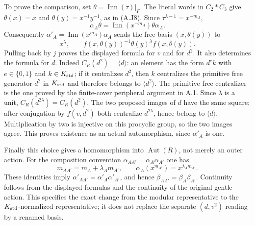 To prove the comparison, set
$\theta=\operatorname{Inn}(\tau)|_F$.
The literal words in $C_2*C_3$ give
$\theta(x)=x$ and $\theta(y)=x^{-1}y^{-1}$, as in
(A.J8).  Since $\tau^{\lambda-1}=x^{-m_A}$,
\[
 \alpha_A\theta
       =\operatorname{Inn}(x^{-m_A})\theta\alpha_A.
\]
Consequently $\alpha'_A=\operatorname{Inn}(x^{m_A})
\alpha_A$ sends the free basis $(x,\theta(y))$ to
\[
 x^\lambda,\qquad
 f(x,\theta(y))^{-1}\theta(y)^\lambda f(x,\theta(y)).
\]
Pulling back by $j$ proves the displayed formula for $v$
and for $d^2$.  It also determines the formula for $d$.
Indeed $C_R(d^2)=\langle d\rangle$: an element has the
form $d^e k$ with $e\in\{0,1\}$ and $k\in K_{\rm std}$;
if it centralizes $d^2$, then $k$ centralizes the primitive
free generator $d^2$ in $K_{\rm std}$ and therefore belongs
to $\langle d^2\rangle$.  The primitive free centralizer
is the one proved by the finite-cover peripheral argument
in A.1.  Since $\lambda$ is a unit,
$C_R(d^{2\lambda})=C_R(d^2)$.
The two proposed images of $d$ have the same square;
after conjugation by $f(v,d^2)$ both centralize
$d^{2\lambda}$, hence belong to $\langle d\rangle$.
Multiplication by two is injective on this procyclic
group, so the two images agree.  This proves existence
as an actual automorphism, since $\alpha'_A$ is one.

Finally this choice gives a homomorphism into
$\operatorname{Aut}(R)$, not merely an outer action.
For the composition convention $\alpha_{AA'}=
\alpha_A\alpha_{A'}$ one has
\[
 m_{AA'}=m_A+\lambda_A m_{A'},\qquad
 \alpha_A(x^{m_{A'}})=x^{\lambda_A m_{A'}}.
\]
These identities imply
$\alpha'_{AA'}=\alpha'_A\alpha'_{A'}$, and hence
$\beta_{AA'}=\beta_A\beta_{A'}$.
Continuity follows from the displayed formulas and the
continuity of the original gentle action.
This specifies the exact change from the modular representative
to the $K_{\rm std}$-normalized representative; it does not
replace the separate $(d,v^2)$ reading by a renamed basis.
